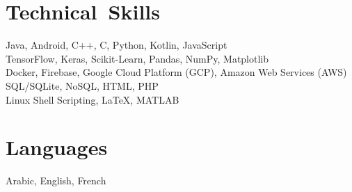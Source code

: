 \section{Technical~Skills}
Java, Android, C++, C, Python, Kotlin, JavaScript\\
TensorFlow, Keras, Scikit-Learn, Pandas, NumPy, Matplotlib\\
Docker, Firebase, Google Cloud Platform (GCP), Amazon Web Services (AWS)\\
SQL/SQLite, NoSQL, HTML, PHP\\
Linux Shell Scripting, LaTeX, MATLAB
\section{Languages}
Arabic, English, French
